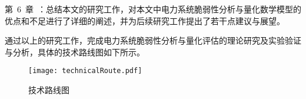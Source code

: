 第~6~章~：总结本文的研究工作，对本文中电力系统脆弱性分析与量化数学模型的优点和不足进行了详细的阐述，并为后续研究工作提出了若干点建议与展望。

通过以上的研究工作，完成电力系统脆弱性分析与量化评估的理论研究及实验验证与分析，具体的技术路线图如下所示。
\begin{figure}[H] %
  \centering
  \texttt{[image: technicalRoute.pdf]}
  \caption{技术路线图}
  \label{fig:technicalRoute}
\end{figure}

